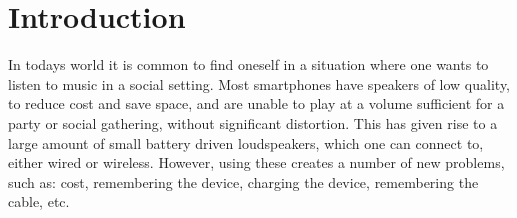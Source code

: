 \chapter{Introduction}\label{cha:introduction}
%
% 
%
%
%
%
%

In todays world it is common to find oneself in a situation where one wants to listen to music in a social setting.
Most smartphones have speakers of low quality, to reduce cost and save space, and are unable to play at a volume sufficient for a party or social gathering, without significant distortion.
This has given rise to a large amount of small battery driven loudspeakers, which one can connect to, either wired or wireless.
However, using these creates a number of new problems, such as: cost, remembering the device, charging the device, remembering the cable, etc.

